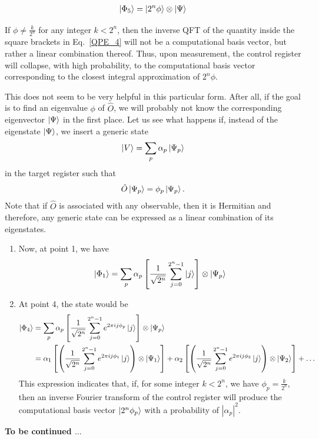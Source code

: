 \documentclass[12pt,oneside]{book}
\begin{document}
\begin{enumerate}
    \begin{align}
        \ket{\Phi_5}=\ket{2^n\phi}\otimes\ket{\Psi}
    \end{align}
    
    If $\phi \neq \frac{k}{2^n}$ for any integer $k<2^n$, then the inverse QFT of the  quantity inside the square brackets in Eq.~\ref{QPE_4} will not be a computational basis vector, but rather a linear combination thereof. Thus, upon measurement, the control register will collapse, with high probability, to the computational basis vector corresponding to the closest integral approximation of $2^n\phi$.
\end{enumerate}

This does not seem to be very helpful in this particular form. After all, if the goal is to find an eigenvalue $\phi$ of $\hat{O}$, we will probably not know the corresponding eigenvector $\ket{\Psi}$ in the first place. Let us see what happens if, instead of the eigenstate $\ket{\Psi}$, we insert a generic state
\begin{align}
    \ket{V}=\sum_p \alpha_p\ket{\Psi_p}
\end{align}
in the target register such that
\begin{align}
    \hat{O}\ket{\Psi_p}=\phi_p\ket{\Psi_p}.
\end{align}
Note that if $\hat{O}$ is associated with any observable, then it is Hermitian and therefore, any generic state can be expressed as a linear combination of its eigenstates.
\begin{enumerate}
    \item Now, at point 1, we have
    \begin{align*}
        \ket{\Phi_1}=\sum_p \alpha_p \left[\frac{1}{\sqrt{2^n}}\sum_{j=0}^{2^n-1}\ket{j}\right]\otimes\ket{\Psi_p}
    \end{align*}
    \item At point 4, the state would be
    \begin{align*}
        \ket{\Phi_4} &{} =\sum_p \alpha_p \left[\frac{1}{\sqrt{2^n}} \sum_{j=0}^{2^n-1}e^{2\pi i j \phi_p}\ket{j}\right]\otimes\ket{\Psi_p}\\
        &{} = \alpha_1 \left[\left(\frac{1}{\sqrt{2^n}} \sum_{j=0}^{2^n-1}e^{2\pi i j \phi_1}\ket{j}\right)\otimes\ket{\Psi_1}\right] + \alpha_2 \left[\left(\frac{1}{\sqrt{2^n}} \sum_{j=0}^{2^n-1}e^{2\pi i j \phi_2}\ket{j}\right)\otimes\ket{\Psi_2}\right] + \hdots
    \end{align*}
    This expression indicates that, if, for some integer $k<2^n$, we have $\phi_p=\frac{k}{2^n}$, then an inverse Fourier transform of the control register will produce the computational basis vector $\ket{2^n\phi_p}$ with a probability of $|\alpha_p|^2$.
\end{enumerate}

\textbf{To be continued $\hdots$}
\end{document}
